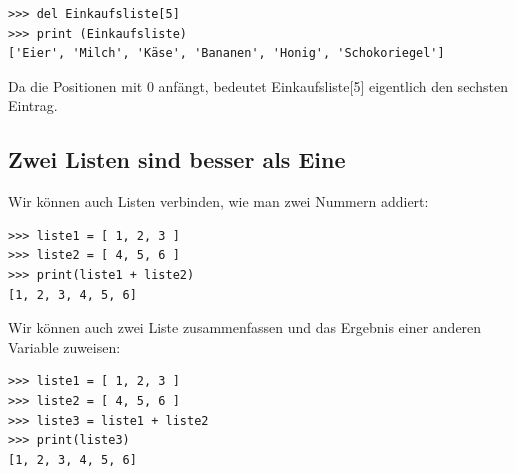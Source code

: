 \begin{Verbatim}[frame=single]
>>> del Einkaufsliste[5]
>>> print (Einkaufsliste)
['Eier', 'Milch', 'Käse', 'Bananen', 'Honig', 'Schokoriegel']
\end{Verbatim}

Da die Positionen mit 0 anfängt, bedeutet Einkaufsliste[5] eigentlich den sechsten Eintrag.

\subsection*{\color{BrickRed}Zwei Listen sind besser als Eine}

Wir können auch Listen verbinden, wie man zwei Nummern addiert:

\begin{Verbatim}[frame=single]
>>> liste1 = [ 1, 2, 3 ]
>>> liste2 = [ 4, 5, 6 ]
>>> print(liste1 + liste2)
[1, 2, 3, 4, 5, 6]
\end{Verbatim}

\noindent
Wir können auch zwei Liste zusammenfassen und das Ergebnis einer anderen Variable zuweisen:

\begin{Verbatim}[frame=single]
>>> liste1 = [ 1, 2, 3 ]
>>> liste2 = [ 4, 5, 6 ]
>>> liste3 = liste1 + liste2
>>> print(liste3)
[1, 2, 3, 4, 5, 6]
\end{Verbatim}

